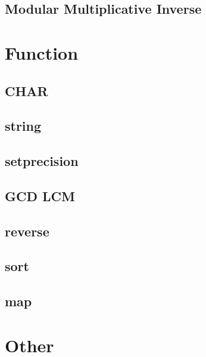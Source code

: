         \subsection{Modular Multiplicative Inverse}
                

\section{Function}
        \subsection{CHAR}
                
        \subsection{string}
                
        \subsection{setprecision}
                
        \subsection{GCD LCM}
                
        \subsection{reverse}
                
        \subsection{sort}
                
        \subsection{map}
                

\section{Other}
